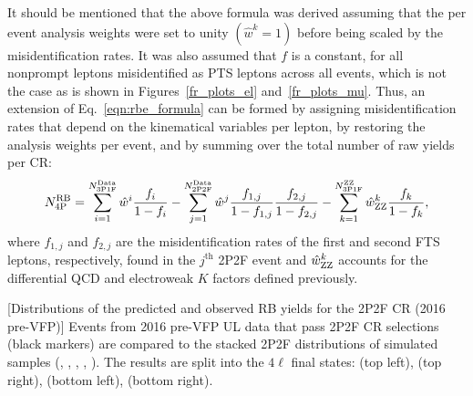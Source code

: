It should be mentioned that the above formula was derived assuming that the per event analysis weights were set to unity $\left( \hat{w}^k = 1 \right)$ before being scaled by the misidentification rates.
It was also assumed that $f$ is a constant, for all nonprompt leptons misidentified as PTS leptons across all events, which is not the case as is shown in Figures~\ref{fr_plots_el} and~\ref{fr_plots_mu}.
Thus, an extension of Eq.~\ref{eqn:rbe_formula} can be formed by assigning misidentification rates that depend on the kinematical variables per lepton,
by restoring the analysis weights per event,
and by summing over the total number of raw yields per CR:
\begin{equation}
	\label{eqn:rbe_formula_final}
	N_\text{4P}^\text{RB} =
	  \sum_{i=1}^{N_{\text{3P1F}}^\text{Data}} \hat{w}^i \frac{f_i}{1 - f_i}
	- \sum_{j=1}^{N_{\text{2P2F}}^\text{Data}} \hat{w}^j \frac{f_{1,j}}{1 - f_{1,j}}\frac{f_{2,j}}{1 - f_{2,j}}
	- \sum_{k=1}^{N_{\text{3P1F}}^{\text{Z}\text{Z}}} \hat{w}^{k}_{\text{Z}\text{Z}} \frac{f_k}{1 - f_k},
\end{equation}
where $f_{1,j}$ and $f_{2,j}$ are the misidentification rates of the first and second FTS leptons, respectively, found in the $j^{\text{th}}$ 2P2F event
and $\hat{w}^k_{\text{Z}\text{Z}}$ accounts for the differential QCD and electroweak $K$ factors defined previously. %
\begin{multiFigure}
	\centering
		[Distributions of the predicted and observed RB yields for the 2P2F CR (2016 pre-VFP)]
		{Events from 2016 pre-VFP UL data that pass 2P2F CR selections (black markers) 
		are compared to the stacked 2P2F distributions of simulated samples
		(\Zplusjets, \ttbarplusjets, \WZ, \ZZ, \Zgammastar).
		The results are split into the $4\ell$ final states:
		\fourmu (top left), \foure (top right), \twoetwomu (bottom left), \twomutwoe (bottom right).}
	\label{cr_plots_2p2f_2016prevfp}
\end{multiFigure}
